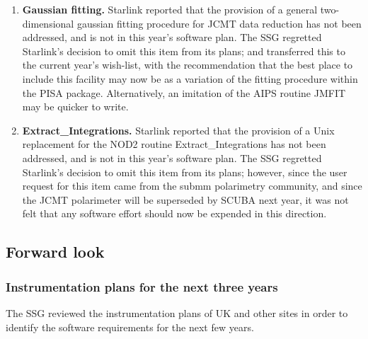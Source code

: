 \begin{enumerate}
\item {\bf  Gaussian fitting.} Starlink reported that the provision of
a general two-dimensional gaussian fitting procedure for JCMT data
reduction has not been addressed, and is not in this year's software
plan. The SSG regretted Starlink's decision to omit this item from its
plans; and transferred this to the current year's wish-list, with the
recommendation that the best place to include this facility may now be
as a variation of the fitting procedure within the PISA
package. Alternatively, an imitation of the AIPS routine JMFIT may be
quicker to write.

\item {\bf Extract\_Integrations.} Starlink reported that the provision of
a Unix replacement for the NOD2 routine Extract\_Integrations has not
been addressed, and is not in this year's software plan. The SSG
regretted Starlink's decision to omit this item from its plans;
however, since the user request for this item came from the submm
polarimetry community, and since the JCMT polarimeter will be
superseded by SCUBA next year, it was not felt that any software
effort should now be expended in this direction.

\end{enumerate}

\subsection{Forward look}

\subsubsection{Instrumentation plans for the next three years}

The SSG reviewed the instrumentation plans of UK and other sites in
order to identify the software requirements for the next few years.

